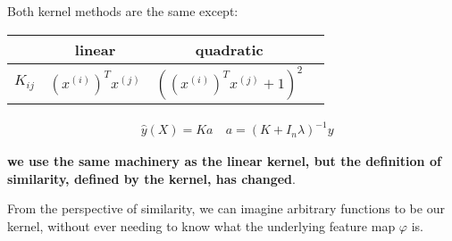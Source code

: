 Both kernel methods are the same except:
\begin{table}
	\begin{tabular}{cccc}
\hline 	& linear & quadratic \\
\hline	$K_{ij}$ & $(x^{(i)})^Tx^{(j)}$ & $\left((x^{(i)})^Tx^{(j)} +1\right)^2$\\ \hline 
	\end{tabular}
\end{table}
\begin{align*}
&\hat{y}(X)= Ka \:
&a =  (K+{I}_n\lambda)^{-1}y
\end{align*}\vspace{-0.4cm}
\pause{}
\begin{center}
	\textbf{we use the same machinery as the linear kernel, but the definition of similarity, defined by the kernel, has changed}.
\end{center}
\pause{}
From the perspective of similarity, we can imagine arbitrary functions to be our kernel, without ever needing to know what the underlying feature map $\varphi$ is.